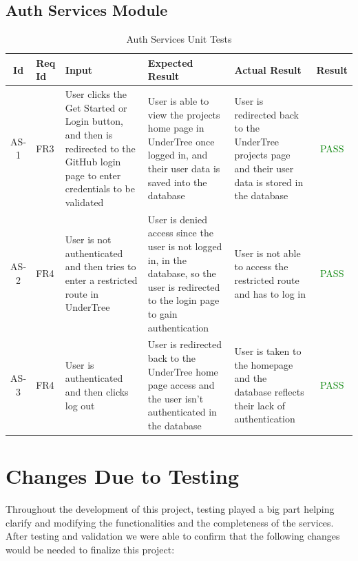 \documentclass[12pt, titlepage]{article}
\begin{document}
	\subsection{Auth Services Module}
	
	\begin{center}
		\begin{longtable}{|c|p{1cm}|p{2.7cm}|p{3cm}|p{3cm}|c|}
			\caption{Auth Services Unit Tests \label{long}}\\
			\hline
			\textbf{Id} & \textbf{Req Id} & \textbf{Input} & \textbf{Expected Result} & \textbf{Actual Result} & \textbf{Result}   \\
			\hline
			AS-1 & FR3 & User clicks the Get Started or Login button, and then is redirected to the GitHub login page to enter credentials to be validated & User is able to view the projects home page in UnderTree once logged in, and their user data is saved into the database & User is redirected back to the UnderTree projects page and their user data is stored in the database &  \textcolor{green}{PASS} \\
			\hline
			AS-2 & FR4 & User is not authenticated and then tries to enter a restricted route in UnderTree & User is denied access since the user is not logged in, in the database, so the user is redirected to the login page to gain authentication & User is not able to access the restricted route and has to log in & \textcolor{green}{PASS} \\
			\hline
			AS-3 & FR4 & User is authenticated and then clicks log out & User is redirected back to the UnderTree home page access and the user isn't authenticated in the database & User is taken to the homepage and the database reflects their lack of authentication & \textcolor{green}{PASS} \\
			\hline
		\end{longtable}
	\end{center}
	\section{Changes Due to Testing}
	
	
	Throughout the development of this project, testing played a big part helping clarify and modifying the functionalities and the completeness of the services. After testing and validation we were able to confirm that the following changes would be needed to finalize this project:
	
\end{document}
